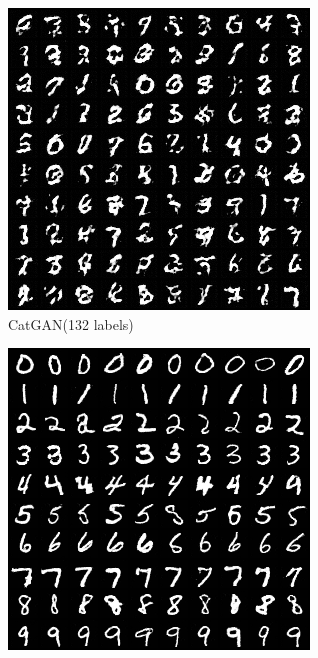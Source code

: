 \begin{figure}[htbp]
  \begin{subfigure}[b]{\trif\textwidth}
    \includegraphics[width=\textwidth]{Img/cg-132labels.png}
    \caption{CatGAN(132 labels)}
    \label{ffig:m-ss-cg}
  \end{subfigure}
  \begin{subfigure}[b]{\trif\textwidth}
    \includegraphics[width=\textwidth]{Img/icg-132labels.png}

\end{subfigure}
\end{figure}
